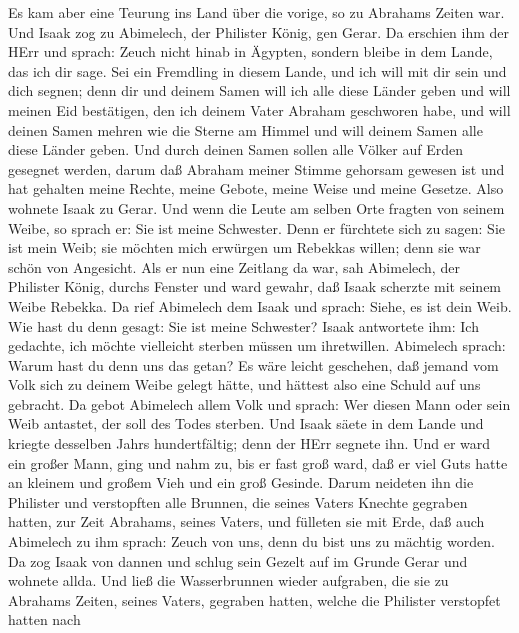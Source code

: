  Es kam aber eine Teurung ins Land über die vorige, so zu
Abrahams Zeiten war. Und Isaak zog zu Abimelech, der Philister König,
gen Gerar.  Da erschien ihm der HErr und sprach: Zeuch nicht
hinab in Ägypten, sondern bleibe in dem Lande, das ich dir sage.
 Sei ein Fremdling in diesem Lande, und ich will mit dir
sein und dich segnen; denn dir und deinem Samen will ich alle diese
Länder geben und will meinen Eid bestätigen, den ich deinem Vater
Abraham geschworen habe,  und will deinen Samen mehren wie
die Sterne am Himmel und will deinem Samen alle diese Länder geben. Und
durch deinen Samen sollen alle Völker auf Erden gesegnet werden,
 darum daß Abraham meiner Stimme gehorsam gewesen ist und
hat gehalten meine Rechte, meine Gebote, meine Weise und meine Gesetze.
 Also wohnete Isaak zu Gerar.  Und wenn die
Leute am selben Orte fragten von seinem Weibe, so sprach er: Sie ist
meine Schwester. Denn er fürchtete sich zu sagen: Sie ist mein Weib; sie
möchten mich erwürgen um Rebekkas willen; denn sie war schön von
Angesicht.  Als er nun eine Zeitlang da war, sah Abimelech,
der Philister König, durchs Fenster und ward gewahr, daß Isaak scherzte
mit seinem Weibe Rebekka.  Da rief Abimelech dem Isaak und
sprach: Siehe, es ist dein Weib. Wie hast du denn gesagt: Sie ist meine
Schwester? Isaak antwortete ihm: Ich gedachte, ich möchte vielleicht
sterben müssen um ihretwillen.  Abimelech sprach: Warum
hast du denn uns das getan? Es wäre leicht geschehen, daß jemand vom
Volk sich zu deinem Weibe gelegt hätte, und hättest also eine Schuld auf
uns gebracht.  Da gebot Abimelech allem Volk und sprach:
Wer diesen Mann oder sein Weib antastet, der soll des Todes sterben.
 Und Isaak säete in dem Lande und kriegte desselben Jahrs
hundertfältig; denn der HErr segnete ihn.  Und er ward ein
großer Mann, ging und nahm zu, bis er fast groß ward,  daß
er viel Guts hatte an kleinem und großem Vieh und ein groß Gesinde.
Darum neideten ihn die Philister  und verstopften alle
Brunnen, die seines Vaters Knechte gegraben hatten, zur Zeit Abrahams,
seines Vaters, und fülleten sie mit Erde,  daß auch
Abimelech zu ihm sprach: Zeuch von uns, denn du bist uns zu mächtig
worden.  Da zog Isaak von dannen und schlug sein Gezelt auf
im Grunde Gerar und wohnete allda.  Und ließ die
Wasserbrunnen wieder aufgraben, die sie zu Abrahams Zeiten, seines
Vaters, gegraben hatten, welche die Philister verstopfet hatten nach
